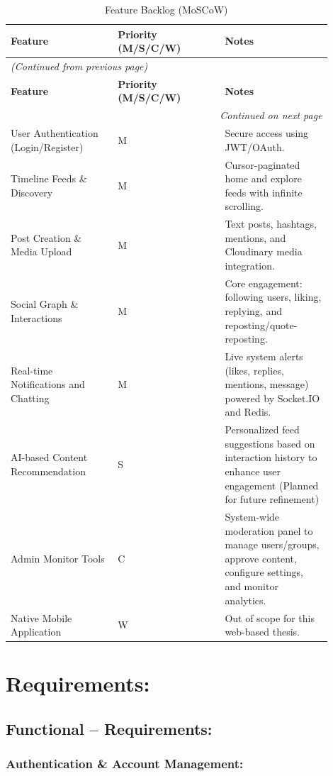 \begin{longtable}{|p{0.3\linewidth}|p{0.3\linewidth}|p{0.3\linewidth}|}
\caption{Feature Backlog (MoSCoW)} \label{tab:4} \\
\hline
\textbf{Feature} & \textbf{Priority (M/S/C/W)} & \textbf{Notes} \\
\hline
\endfirsthead
\multicolumn{3}{l}{\textit{(Continued from previous page)}} \\
\hline
\textbf{Feature} & \textbf{Priority (M/S/C/W)} & \textbf{Notes} \\
\hline
\endhead
\hline \multicolumn{3}{r}{\textit{Continued on next page}} \\
\endfoot
\hline
\endlastfoot
User Authentication (Login/Register) & M & Secure access using JWT/OAuth. \\
\hline
Timeline Feeds \& Discovery & M & Cursor-paginated home and explore feeds with infinite scrolling. \\
\hline
Post Creation \& Media Upload & M & Text posts, hashtags, mentions, and Cloudinary media integration. \\
\hline
Social Graph \& Interactions & M & Core engagement: following users, liking, replying, and reposting/quote-reposting. \\
\hline
Real-time Notifications and Chatting & M & Live system alerts (likes, replies, mentions, message) powered by Socket.IO and Redis. \\
\hline
AI-based Content Recommendation & S & Personalized feed suggestions based on interaction history to enhance user engagement (Planned for future refinement) \\
\hline
Admin Monitor Tools & C & System-wide moderation panel to manage users/groups, approve content, configure settings, and monitor analytics. \\
\hline
Native Mobile Application & W & Out of scope for this web-based thesis. \\
\hline
\end{longtable}


\section{Requirements:}

\subsection{Functional -- Requirements:}

\subsubsection{Authentication \& Account Management:}

